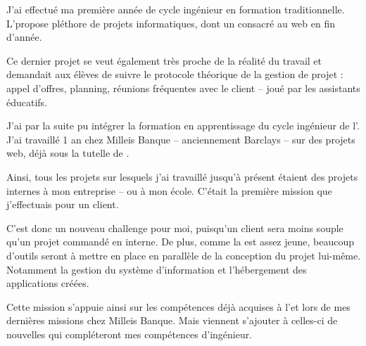 J'ai effectué ma première année de cycle ingénieur en formation traditionnelle.\\
L'\epita propose pléthore de projets informatiques, dont un consacré au web en fin d'année.

Ce dernier projet se veut également très proche de la réalité du travail et demandait aux élèves de suivre le protocole théorique de la gestion de projet : appel d'offres, planning, réunions fréquentes avec le \og client \fg{} -- joué par les assistants éducatifs.

J'ai par la suite pu intégrer la formation en apprentissage du cycle ingénieur de l'\epita. J'ai travaillé 1 an chez Milleis Banque -- anciennement Barclays -- sur des projets web, déjà sous la tutelle de \damien.

Ainsi, tous les projets sur lesquels j'ai travaillé jusqu'à présent étaient des projets internes à mon entreprise -- ou à mon école.
C'était la première mission que j'effectuais pour un client.

C'est donc un nouveau challenge pour moi, puisqu'un client sera moins souple qu'un projet commandé en interne.
De plus, comme la \df est assez jeune, beaucoup d'outils seront à mettre en place en parallèle de la conception du projet lui-même. Notamment la gestion du système d'information et l'hébergement des applications créées.

Cette mission s'appuie ainsi sur les compétences déjà acquises à l'\epita et lors de mes dernières missions chez Milleis Banque. Mais viennent s'ajouter à celles-ci de nouvelles qui compléteront mes compétences d'ingénieur.